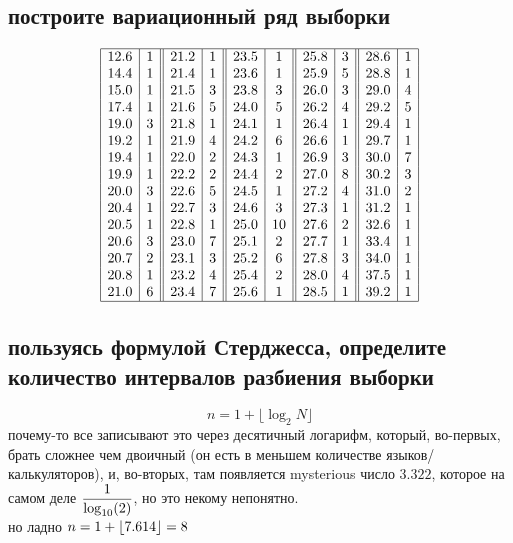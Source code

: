 \documentclass{article}
\begin{document}
  \subsection{построите вариационный ряд выборки}
  $$
    \begin{array}{|c|c||c|c||c|c||c|c||c|c|}
      \hline
      12.6 & 1 & 21.2 & 1 & 23.5 & 1 & 25.8 & 3 & 28.6 & 1 \\
      14.4 & 1 & 21.4 & 1 & 23.6 & 1 & 25.9 & 5 & 28.8 & 1 \\
      15.0 & 1 & 21.5 & 3 & 23.8 & 3 & 26.0 & 3 & 29.0 & 4 \\
      17.4 & 1 & 21.6 & 5 & 24.0 & 5 & 26.2 & 4 & 29.2 & 5 \\
      19.0 & 3 & 21.8 & 1 & 24.1 & 1 & 26.4 & 1 & 29.4 & 1 \\
      19.2 & 1 & 21.9 & 4 & 24.2 & 6 & 26.6 & 1 & 29.7 & 1 \\
      19.4 & 1 & 22.0 & 2 & 24.3 & 1 & 26.9 & 3 & 30.0 & 7 \\
      19.9 & 1 & 22.2 & 2 & 24.4 & 2 & 27.0 & 8 & 30.2 & 3 \\
      20.0 & 3 & 22.6 & 5 & 24.5 & 1 & 27.2 & 4 & 31.0 & 2 \\
      20.4 & 1 & 22.7 & 3 & 24.6 & 3 & 27.3 & 1 & 31.2 & 1 \\
      20.5 & 1 & 22.8 & 1 & 25.0 & 10 & 27.6 & 2 & 32.6 & 1 \\
      20.6 & 3 & 23.0 & 7 & 25.1 & 2 & 27.7 & 1 & 33.4 & 1 \\
      20.7 & 2 & 23.1 & 3 & 25.2 & 6 & 27.8 & 3 & 34.0 & 1 \\
      20.8 & 1 & 23.2 & 4 & 25.4 & 2 & 28.0 & 4 & 37.5 & 1 \\
      21.0 & 6 & 23.4 & 7 & 25.6 & 1 & 28.5 & 1 & 39.2 & 1 \\
      \hline
    \end{array}
  $$

  \subsection{пользуясь формулой Стерджесса, определите количество интервалов разбиения выборки}
  $$ n = 1+\lfloor \log_2 N \rfloor $$
  почему-то все записывают это через десятичный логарифм,
  который, во-первых, брать сложнее чем двоичный (он есть в меньшем количестве языков/калькуляторов),
  и, во-вторых, там появляется mysterious число $3.322$, которое на самом деле $\displaystyle \frac{1}{\log_{10}(2)}$,
  но это некому непонятно. \\
  но ладно $\displaystyle n = 1+ \lfloor 7.614 \rfloor = 8 $
\end{document}
